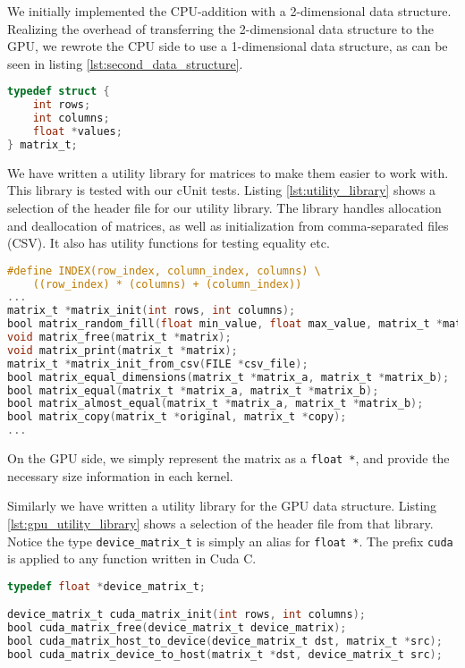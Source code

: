\noindent We initially implemented the CPU-addition with a 2-dimensional data structure. Realizing the overhead of transferring the 2-dimensional data structure to the GPU, we rewrote the CPU side to use a 1-dimensional data structure, as can be seen in listing \ref{lst:second_data_structure}.

\begin{lstlisting}[language=C, caption={Second implementation of the matrix data structure.}, label={lst:second_data_structure}]
typedef struct {
    int rows;
    int columns;
    float *values;
} matrix_t;
\end{lstlisting}

\noindent We have written a utility library for matrices to make them easier to work with. This library is tested with our cUnit tests. Listing \ref{lst:utility_library} shows a selection of the header file for our utility library. The library handles allocation and deallocation of matrices, as well as initialization from comma-separated files (CSV). It also has utility functions for testing equality etc.

\begin{lstlisting}[language=C, caption={Utility library for the CPU data structure.}, label={lst:utility_library}]
#define INDEX(row_index, column_index, columns) \
    ((row_index) * (columns) + (column_index))
...
matrix_t *matrix_init(int rows, int columns);
bool matrix_random_fill(float min_value, float max_value, matrix_t *matrix);
void matrix_free(matrix_t *matrix);
void matrix_print(matrix_t *matrix);
matrix_t *matrix_init_from_csv(FILE *csv_file);
bool matrix_equal_dimensions(matrix_t *matrix_a, matrix_t *matrix_b);
bool matrix_equal(matrix_t *matrix_a, matrix_t *matrix_b);
bool matrix_almost_equal(matrix_t *matrix_a, matrix_t *matrix_b);
bool matrix_copy(matrix_t *original, matrix_t *copy);
...
\end{lstlisting}

\noindent On the GPU side, we simply represent the matrix as a \texttt{float *}, and provide the necessary size information in each kernel.

Similarly we have written a utility library for the GPU data structure. Listing \ref{lst:gpu_utility_library} shows a selection of the header file from that library. Notice the type \texttt{device\_matrix\_t} is simply an alias for \texttt{float *}. The prefix \texttt{cuda} is applied to any function written in Cuda C. 

\begin{lstlisting}[language=C, caption={Utility library for the GPU data structure.}, label={lst:gpu_utility_library}]
typedef float *device_matrix_t;

device_matrix_t cuda_matrix_init(int rows, int columns);
bool cuda_matrix_free(device_matrix_t device_matrix);
bool cuda_matrix_host_to_device(device_matrix_t dst, matrix_t *src);
bool cuda_matrix_device_to_host(matrix_t *dst, device_matrix_t src);
\end{lstlisting}